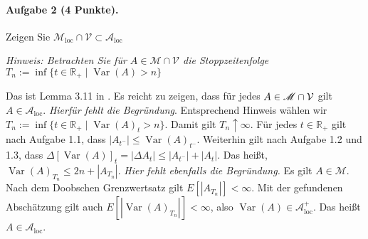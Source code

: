 \documentclass{article}
\begin{document}
\paragraph{Aufgabe 2 \textnormal{(4 Punkte)}.}
Zeigen Sie $\mathscr{M}_{\text{loc}}\cap\mathcal{V}\subset\mathscr{A}_{\text{loc}}$

\noindent\emph{Hinweis: Betrachten Sie für $A\in\mathscr{M}\cap\mathcal{V}$ die Stoppzeitenfolge $T_n:=\inf\{t\in\mathbb{R}_+\mid\operatorname{Var}(A)>n\}$}

Das ist Lemma 3.11 in \cite{jacod2013limit}.
Es reicht zu zeigen, dass für jedes $A\in\mathscr{M}\cap{\cal V}$ gilt $A\in\mathscr{A}_{\text{loc}}$.
\emph{Hierfür fehlt die Begründung}.
Entsprechend Hinweis wählen wir $T_n:=\inf\{t\in\mathbb{R}_+\mid\operatorname{Var}(A)_t>n\}$.
Damit gilt $T_n\uparrow\infty$.
Für jedes $t\in\mathbb{R}_+$ gilt nach Aufgabe 1.1, dass $|A_{t^-}|\leq\operatorname{Var}(A)_{t^-}$.
Weiterhin gilt nach Aufgabe 1.2 und 1.3, dass $\Delta[\operatorname{Var}(A)]_t=|\Delta A_t|\leq|A_{t^-}|+|A_t|$.
Das heißt, $\operatorname{Var}(A)_{T_n}\leq 2n+|A_{T_n}|$.
\emph{Hier fehlt ebenfalls die Begründung.}
Es gilt $A\in\mathscr{M}$.
Nach dem Doobschen Grenzwertsatz gilt $E[|A_{T_n}|]<\infty$.
Mit der gefundenen Abschätzung gilt auch $E[|\operatorname{Var}(A)_{T_n}|]<\infty$, also $\operatorname{Var}(A)\in\mathscr{A}_{\text{loc}}^+$.
Das heißt $A\in\mathscr{A}_{\text{loc}}$.

\end{document}
